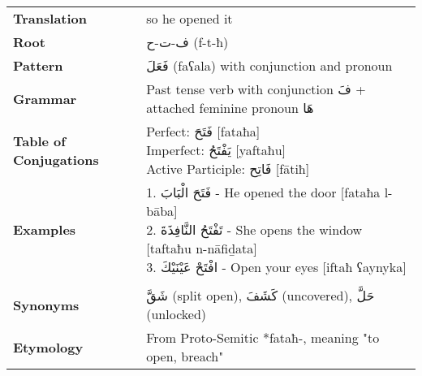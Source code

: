 \documentclass[letter,12pt]{article}
\begin{document}
\begin{tabular}{p{3cm}p{10cm}}
\toprule
\textbf{Translation} & so he opened it \\
\textbf{Root} & \textarabic{ف-ت-ح} (f-t-ħ) \\
\textbf{Pattern} & \textarabic{فَعَلَ} (faʕala) with conjunction and pronoun \\
\textbf{Grammar} & Past tense verb with conjunction \textarabic{فَ} + attached feminine pronoun \textarabic{هَا} \\
\textbf{Table of Conjugations} & \makecell[l]{
Perfect: \textarabic{فَتَحَ} [fataħa]\\
Imperfect: \textarabic{يَفْتَحُ} [yaftaħu]\\
Active Participle: \textarabic{فَاتِح} [fātiħ]
} \\
\textbf{Examples} & \makecell[l]{\parbox{9.5cm}{
1. \textarabic{فَتَحَ الْبَابَ} - He opened the door [fataħa l-bāba]\\
2. \textarabic{تَفْتَحُ النَّافِذَةَ} - She opens the window [taftaħu n-nāfiḏata]\\
3. \textarabic{افْتَحْ عَيْنَيْكَ} - Open your eyes [iftaħ ʕaynyka]
}} \\
\midrule \\
\textbf{Synonyms} & \textarabic{شَقَّ} (split open), \textarabic{كَشَفَ} (uncovered), \textarabic{حَلَّ} (unlocked) \\
\textbf{Etymology} & From Proto-Semitic *fataħ-, meaning "to open, breach" \\
\bottomrule
\end{tabular}
\end{document}
